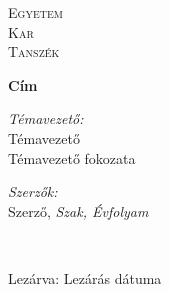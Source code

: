 %
%
%

\begin{titlepage}

\center

\textsc{\LARGE {Egyetem}}\\[1.5cm]
\textsc{\Large {Kar}}
\\[0.5cm]

\textsc{\large {Tanszék}}
\\[2.5cm]

{\huge \bfseries {Cím} \par}

\ifdefined\printName
  \vspace*{6.5cm}

  \begin{minipage}{.4\linewidth}
    \begin{flushleft}
      \large \textit{Témavezető:} \\
      {Témavezető} \\
      {Témavezető fokozata}
    \end{flushleft}
  \end{minipage}
  \hfill
  \begin{minipage}{.52\linewidth} 
    \begin{flushright}
      \large \textit{Szerzők:}\\
      {Szerző}, \textit{{Szak}, {Évfolyam}}
    \end{flushright}
  \end{minipage}
  \\[2.5cm]
\else
  \vspace*{10.5cm}
\fi

{\large Lezárva: {Lezárás dátuma}}\\ 

\vfill

\end{titlepage}
